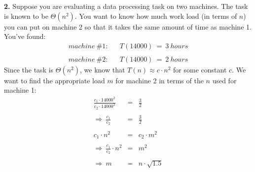 {\bf{2.}} Suppose you are evaluating a data processing task on
two machines. The task is known to be $\Theta(n^2)$.
You want to know how much work load (in terms of $n$) you can
put on machine 2 so that it takes the same amount of time as
machine 1. You've found:
\begin{eqnarray*}
{\mathit{machine\ \#1:}} & & T(14000) \ = \ 3 \ {\mathit{hours}} \\
& & \\
{\mathit{machine\ \#2:}} & & T(14000) \ = \ 2 \ {\mathit{hours}}
\end{eqnarray*}
Since the task is $\Theta(n^2)$, we know that $T(n) \approx c{\cdot}n^2$
for some constant $c$. We want to find the appropriate load $m$ for
machine 2 in terms of the $n$ used for machine 1:
\begin{eqnarray*}
\frac{c_1{\cdot}{14000}^2}{c_2{\cdot}{14000}^2} & = & \frac{3}{2} \\
& & \\
\Rightarrow \ \frac{c_1}{c_2} & = & \frac{3}{2} \\
& & \\
c_1{\cdot}n^2 & = & c_2{\cdot}m^2 \\
& & \\
\Rightarrow \ \frac{c_1}{c_2}{\cdot}n^2 & = & m^2 \\
& & \\
\Rightarrow \ m & = & n{\cdot}\sqrt{1.5} \\
\end{eqnarray*}




\vspace*{2em}

